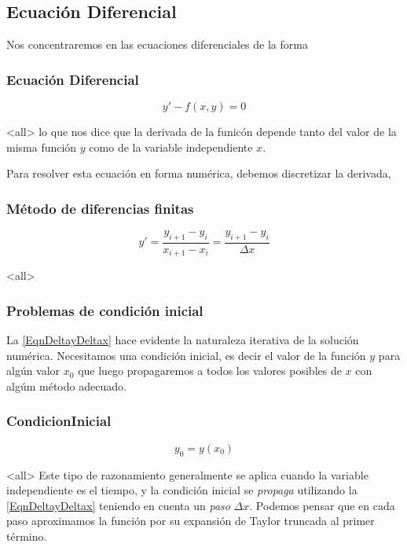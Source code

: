 \subsection{Ecuación Diferencial}


Nos concentraremos en las ecuaciones diferenciales de la forma

\mode*
\begin{frame}
  \frametitle<presentation>{Ecuación Diferencial}
\begin{equation}\label{EqnEDO}
  y'- f(x, y) = 0
\end{equation}
\end{frame}
\mode<all>
\noindent lo que nos dice que la derivada de la funicón depende tanto del valor de la misma función
$y$ como de la variable independiente $x$.

Para resolver esta ecuación en forma numérica, debemos discretizar la derivada, 
%
\mode*
\begin{frame}[label=FrameDiferenciasFinitas]
  \frametitle<presentation>{Método de diferencias finitas}
\begin{equation}\label{EqnDeltayDeltax}
    y' = \dfrac{y_{i+1} - y_i}{x_{i+1} - x_i} = \dfrac{y_{i+1} - y_i}{\Delta x}
\end{equation}
\end{frame}

\mode<all>


\subsubsection{Problemas de condición inicial}

La \autoref{EqnDeltayDeltax}  hace evidente la naturaleza iterativa de la solución numérica. 
Necesitamos una condición inicial, es decir el valor de la función $y$ para algún valor $x_0$ 
que luego propagaremos a todos los valores posibles de $x$ con algúm método adecuado.

\mode*
\begin{frame}[label=FrameCondicionInicial]
  \frametitle<presentation>{CondicionInicial}
\begin{equation}\label{EqnCondicionInicail}
  y_0 = y(x_0)
\end{equation}
\end{frame}
\mode<all>
Este tipo de razonamiento generalmente se aplica cuando la variable independiente es el tiempo, 
y la condición inicial se \emph{propaga} utilizando la \autoref{EqnDeltayDeltax}
teniendo en cuenta un \emph{paso} $\Delta x$. 
Podemos pensar que en cada paso aproximamos la función por su expansión de Taylor truncada al primer
término. 

